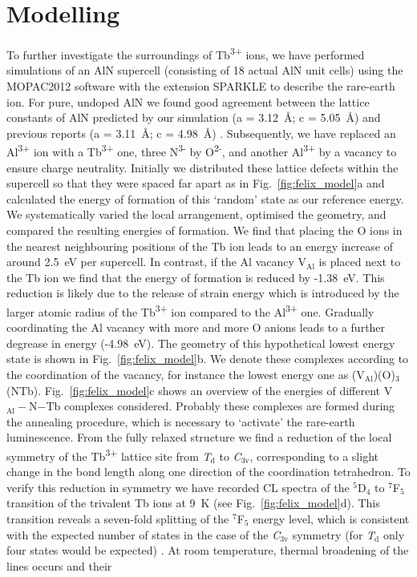 \documentclass[%
aip,
rsi,%
 amsmath,amssymb,%
 reprint,%
]{revtex4-1}
\begin{document}
\section{Modelling}
\label{sec:model}

To further investigate the surroundings of Tb\textsuperscript{3+} ions, we have performed simulations of an AlN supercell (consisting of 18 actual AlN unit cells) using the MOPAC2012 software \cite{steward12} with the extension SPARKLE \cite{freire10} to describe the rare-earth ion. For pure, undoped AlN we found good agreement between the lattice constants of AlN predicted by our simulation (a = 3.12~\AA; c = 5.05~\AA) and previous reports (a = 3.11~\AA; c = 4.98~\AA) \cite{ICDD11}. Subsequently, we have replaced an Al\textsuperscript{3+} ion with a Tb\textsuperscript{3+} one, three N\textsuperscript{3-} by O\textsuperscript{2-}, and another Al\textsuperscript{3+} by a vacancy to ensure charge neutrality. Initially we distributed these lattice defects within the supercell so that they were spaced far apart as in Fig.~\ref{fig:felix_model}a and calculated the energy of formation of this \lq{random}\rq{} state as our reference energy. We systematically varied the local arrangement, optimised the geometry, and compared the resulting energies of formation. We find that placing the O ions in the nearest neighbouring positions of the Tb ion leads to an energy increase of around 2.5~eV per supercell. In contrast, if the Al vacancy V$_\text{Al}$ is placed next to the Tb ion we find that the energy of formation is reduced by -1.38~eV. This reduction is likely due to the release of strain energy which is introduced by the larger atomic radius of the Tb\textsuperscript{3+} ion compared to the Al\textsuperscript{3+} one. Gradually coordinating the Al vacancy with more and more O anions leads to a further degrease in energy (-4.98~eV). The geometry of this hypothetical lowest energy state is shown in Fig.~\ref{fig:felix_model}b. We denote these complexes according to the coordination of the vacancy, for instance the lowest energy one as (V$_\text{Al}$)(O)$_3$(NTb). Fig.~\ref{fig:felix_model}c shows an overview of the energies of different V$_\text{Al}-$N$-$Tb complexes considered. Probably these complexes are formed during the annealing procedure, which is necessary to \lq{activate}\rq{} the rare-earth luminescence. From the fully relaxed structure we find a reduction of the local symmetry of the Tb\textsuperscript{3+} lattice site from \textit{T$_\text{d}$} to \textit{C$_\text{3v}$}, corresponding to a slight change in the bond length along one direction of the coordination tetrahedron. To verify this reduction in symmetry we have recorded CL spectra of the $^5$D$_4$ to $^7$F$_5$ transition of the trivalent Tb ions at 9~K (see Fig.~\ref{fig:felix_model}d). This transition reveals a seven-fold splitting of the $^7$F$_5$ energy level, which is consistent with the expected number of states in the case of the \textit{C$_\text{3v}$} symmetry (for \textit{T$_\text{d}$} only four states would be expected) \cite{henderson05}. At room temperature, thermal broadening of the lines occurs and their 
\end{document}

